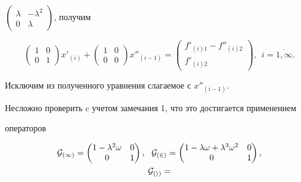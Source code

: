 \begin{exam}
$\left(\begin{smallmatrix}


 \lambda & -\lambda^2\\ 0 & \lambda 


\end{smallmatrix}\right)$, получим


$$


\begin{pmatrix}


 1 & 0\\ 0 & 1 


\end{pmatrix} x'_{(i)}+


\begin{pmatrix}


 1 & 0\\ 0 & 0 


\end{pmatrix} x''_{(i-1)}=


\begin{pmatrix}


 f'_{(i)1}- f''_{(i)2}\\ f'_{(i)2}


\end{pmatrix},\ \ i=\overline{1,\infty}.


$$


Исключим из полученного уравнения слагаемое с $x''_{(i-1)}$.


Несложно проверить c учетом замечания 1, что это достигается применением 


операторов


\begin{gather*}


\cal G_{(1)}=


\begin{pmatrix}


 1-\lambda^2 \omega & 0\\ 0 & 1 


\end{pmatrix}, \ \


\cal G_{(2)}=


\begin{pmatrix}


 1-\lambda \omega +\lambda^3 \omega^2 & 0\\ 0 & 1 


\end{pmatrix}, \\


%


\cal G_{(i)}=



\end{gather*}
\end{exam}
